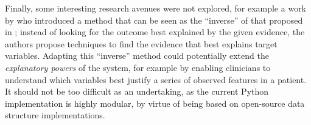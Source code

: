 Finally, some interesting research avenues were not explored, for example a work by \citet{Kyrimi2016} who introduced a method that can be seen as the \enquote{inverse} of that proposed in \citep{Butz2018}; instead of looking for the outcome best explained by the given evidence, the authors propose techniques to find the evidence that best explains target variables.
Adapting this \enquote{inverse} method could potentially extend the \textit{explanatory powers} of the system, for example by enabling clinicians to understand which variables best justify a series of observed features in a patient.
It should not be too difficult as an undertaking, as the current Python implementation is highly modular, by virtue of being based on open-source data structure implementations.